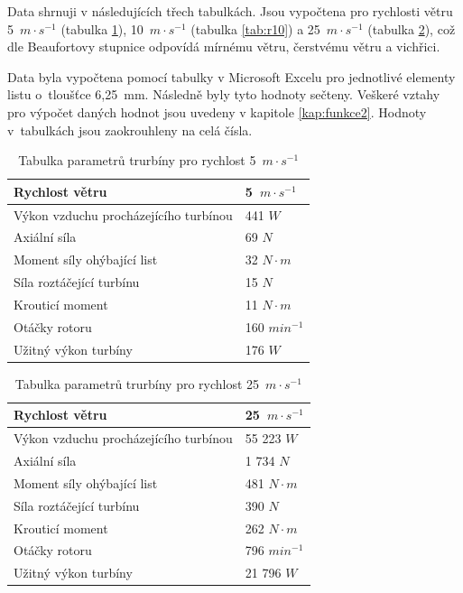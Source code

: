 	Data shrnuji v následujících třech tabulkách. Jsou vypočtena pro rychlosti větru 5~$m\cdot s^{-1}$ (tabulka \ref{tab:r5}), 10~$m\cdot s^{-1}$ (tabulka \ref{tab:r10}) a 25~$m\cdot s^{-1}$ (tabulka \ref{tab:r25}), což dle Beaufortovy stupnice odpovídá mírnému větru, čerstvému větru a vichřici.
	
	Data byla vypočtena pomocí tabulky v Microsoft Excelu pro jednotlivé elementy listu o~tloušťce 6,25~mm. Následně byly tyto hodnoty sečteny. Veškeré vztahy pro výpočet daných hodnot jsou uvedeny v kapitole \ref{kap:funkce2}. Hodnoty v~tabulkách jsou zaokrouhleny na celá čísla.
	\begin{table}[H]
		\centering
		\begin{tabular}{|l|l|}
		\hline
		Rychlost větru	&	5~$m\cdot s^{-1}$\\ \hline \hline
		Výkon vzduchu procházejícího turbínou	&441 $W$\\ \hline
		Axiální síla	&	69 $N$\\\hline
		Moment síly ohýbající list	&	32 $N\cdot m$\\\hline
		Síla roztáčející turbínu	&	15 $N$\\\hline
		Krouticí moment	&	11 $N\cdot m$\\\hline
		Otáčky rotoru	&	160 $min^{-1}$\\\hline
		Užitný výkon turbíny	&	176 $W$\\\hline	
		\end{tabular}
		\caption{Tabulka parametrů trurbíny pro rychlost 5~$m\cdot s^{-1}$}\label{tab:r5}
	\end{table}
	
		
		\begin{table}[H]
				\centering
				\begin{tabular}{|l|l|}
				\hline
				Rychlost větru	&	25~$m\cdot s^{-1}$\\ \hline \hline
				Výkon vzduchu procházejícího turbínou	&55 223 $W$\\ \hline
				Axiální síla	&1 734 $N$\\\hline
				Moment síly ohýbající list	&	481 $N\cdot m$\\\hline
				Síla roztáčející turbínu	&	390 $N$\\\hline
				Krouticí moment	&	262 $N\cdot m$\\\hline
				Otáčky rotoru	&	796 $min^{-1}$\\\hline
				Užitný výkon turbíny	&21 796 $W$\\\hline	
				\end{tabular}
				\caption{Tabulka parametrů trurbíny pro rychlost 25~$m\cdot s^{-1}$}\label{tab:r25}
			\end{table}
	

